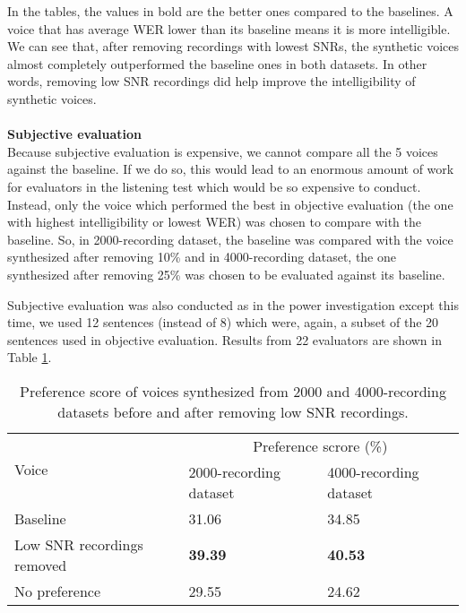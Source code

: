 \documentclass[12pt]{article}
\begin{document}
In the tables, the values in bold are the better ones compared to the baselines. A voice that has average WER lower than its baseline means it is more intelligible. We can see that, after removing recordings with lowest SNRs, the synthetic voices almost completely outperformed the baseline ones in both datasets. In other words, removing low SNR recordings did help improve the intelligibility of synthetic voices.\\\\
\textbf{Subjective evaluation}
\vspace{0.28cm}\\
Because subjective evaluation is expensive, we cannot compare all the 5 voices against the baseline. If we do so, this would lead to an enormous amount of work for evaluators in the listening test which would be so expensive to conduct. Instead, only the voice which performed the best in objective evaluation (the one with highest intelligibility or lowest WER) was chosen to compare with the baseline. So, in 2000-recording dataset, the baseline was compared with the voice synthesized after removing 10\% and in 4000-recording dataset, the one synthesized after removing 25\% was chosen to be evaluated against its baseline.

Subjective evaluation was also conducted as in the power investigation except this time, we used 12 sentences (instead of 8) which were, again, a subset of the 20 sentences used in objective evaluation. Results from 22 evaluators are shown in Table \ref{tab_subEvaSnr}.

\begin{table}[]
\begin{center}
\caption{Preference score of voices synthesized from 2000 and 4000-recording datasets before and after removing low SNR recordings.}
\label{tab_subEvaSnr}
\vspace{3mm}
\begin{tabular}{|l|m{2.8cm}|m{2.8cm}|}
\hline
\multirow{2}{4cm}{Voice} &
\multicolumn{2}{c|}{Preference scrore (\%)} \\ \cline{2-3}
& 2000-recording dataset & 4000-recording dataset \\
\hline
Baseline                   & 31.06          & 34.85 \\
Low SNR recordings removed & \textbf{39.39} & \textbf{40.53} \\
No preference              & 29.55          & 24.62 \\
\hline
\end{tabular}
\end{center}
\end{table}
\end{document}
